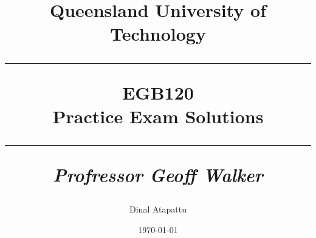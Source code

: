 \documentclass[oneside]{book}
\begin{document}
\pagestyle{fancy}
    \fancyhf{}
\fancyhead[R]{\nouppercase{\leftmark}}
\renewcommand{\footrulewidth}{0.4pt}
    \title{
            Queensland University of Technology\\
            \rule{\linewidth}{0.5pt}
        \centering
        \textbf{EGB120} \\
        Practice Exam Solutions\\
        \vspace{0.4cm}
        \rule{\linewidth}{1.5pt}
        \small{\textit{Profressor Geoff Walker}}
    }
    \author{Dinal Atapattu}
    \date{\today}
    \maketitle
    \thispagestyle{empty}
    \tableofcontents
    
    
\end{document}
